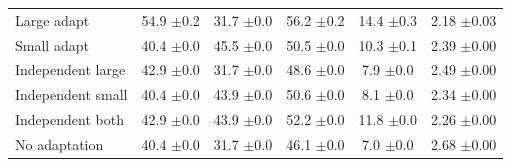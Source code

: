\begin{table}[t]
\begin{tabular}{lccccc}
        Large adapt & 54.9 {\scriptsize$\pm$0.2} & 31.7 {\scriptsize$\pm$0.0} & 56.2 {\scriptsize$\pm$0.2} & 14.4 {\scriptsize$\pm$0.3} & 2.18 {\scriptsize$\pm$0.03} \\
        Small adapt & 40.4 {\scriptsize$\pm$0.0} & 45.5 {\scriptsize$\pm$0.0} & 50.5 {\scriptsize$\pm$0.0} & 10.3 {\scriptsize$\pm$0.1} & 2.39 {\scriptsize$\pm$0.00} \\
        \midrule
        Independent large & 42.9 {\scriptsize$\pm$0.0} & 31.7 {\scriptsize$\pm$0.0} & 48.6 {\scriptsize$\pm$0.0} & 7.9 {\scriptsize$\pm$0.0} & 2.49 {\scriptsize$\pm$0.00} \\
        Independent small & 40.4 {\scriptsize$\pm$0.0} & 43.9 {\scriptsize$\pm$0.0} & 50.6 {\scriptsize$\pm$0.0} & 8.1 {\scriptsize$\pm$0.0} & 2.34 {\scriptsize$\pm$0.00} \\
        Independent both & 42.9 {\scriptsize$\pm$0.0} & 43.9 {\scriptsize$\pm$0.0} & 52.2 {\scriptsize$\pm$0.0} & 11.8 {\scriptsize$\pm$0.0} & 2.26 {\scriptsize$\pm$0.00} \\
        \midrule
        No adaptation & 40.4 {\scriptsize$\pm$0.0} & 31.7 {\scriptsize$\pm$0.0} & 46.1 {\scriptsize$\pm$0.0} & 7.0 {\scriptsize$\pm$0.0} & 2.68 {\scriptsize$\pm$0.00} \\
        \bottomrule
    \end{tabular}
\end{table}
